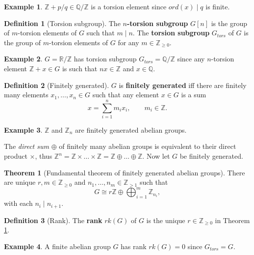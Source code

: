 \documentclass{article}
\newcommand{\Z}{\mathbb{Z}}
\newcommand{\Q}{\mathbb{Q}}
\newcommand{\R}{\mathbb{R}}
\newcommand{\rb}[1]{\left( #1 \right)}
\renewcommand{\sb}[1]{\left[ #1 \right]}
\theoremstyle{definition}\newtheorem*{definition}{Definition}
\theoremstyle{definition}\newtheorem*{example}{Example}
\theoremstyle{definition}\newtheorem*{remark}{Remark}
\newtheorem{theorem}[proposition]{Theorem}
\begin{document}
\begin{example}
$ \Z + p / q \in \Q / \Z $ is a torsion element since $ ord\rb{x} \mid q $ is finite.
\end{example}

\begin{definition}[Torsion subgroup]
The \textbf{$ n $-torsion subgroup} $ G\sb{n} $ is the group of $ m $-torsion elements of $ G $ such that $ m \mid n $. The \textbf{torsion subgroup} $ G_{tors} $ of $ G $ is the group of $ m $-torsion elements of $ G $ for any $ m \in \Z_{\ge 0} $.
\end{definition}

\begin{example}
$ G = \R / \Z $ has torsion subgroup $ G_{tors} = \Q / \Z $ since any $ n $-torsion element $ \Z + x \in G $ is such that $ nx \in \Z $ and $ x \in \Q $.
\end{example}

\begin{definition}[Finitely generated]
$ G $ is \textbf{finitely generated} iff there are finitely many elements $ x_1, \dots, x_n \in G $ such that any element $ x \in G $ is a sum
$$ x = \sum_{i = 1}^n m_ix_i, \qquad m_i \in \Z. $$
\end{definition}

\begin{example}
$ \Z $ and $ \Z_n $ are finitely generated abelian groups.
\end{example}

The \emph{direct sum} $ \oplus $ of finitely many abelian groups is equivalent to their direct product $ \times $, thus $ \Z^n = \Z \times \dots \times \Z = \Z \oplus \dots \oplus \Z $. Now let $ G $ be finitely generated.

\begin{theorem}[Fundamental theorem of finitely generated abelian groups]
\label{thm:ftfgag}
There are unique $ r, m \in \Z_{\ge 0} $ and $ n_1, \dots, n_m \in \Z_{> 1} $ such that
$$ G \cong r\Z \oplus \bigoplus_{i = 1}^m \Z_{n_i}, $$
with each $ n_i \mid n_{i + 1} $.
\end{theorem}

\begin{definition}[Rank]
The \textbf{rank} $ rk\rb{G} $ of $ G $ is the unique $ r \in \Z_{\ge 0} $ in Theorem \ref{thm:ftfgag}.
\end{definition}

\begin{example}
A finite abelian group $ G $ has rank $ rk\rb{G} = 0 $ since $ G_{tors} = G $.
\end{example}
\end{document}
